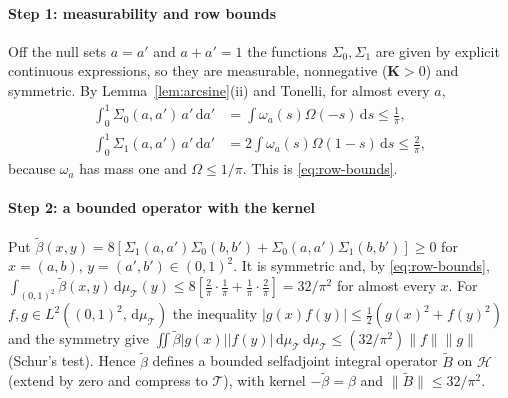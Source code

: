 \documentclass[preprint,12pt,a4paper]{elsarticle}
\theoremstyle{remark}
\newcommand{\dd}{\,\mathrm d}
\begin{document}
\paragraph{Step 1: measurability and row bounds}
Off the null sets $a=a'$ and $a+a'=1$ the functions $\Sigma_0,\Sigma_1$ are given by
explicit continuous expressions, so they are measurable, nonnegative ($\mathbf K>0$) and
symmetric. By Lemma~\ref{lem:arcsine}(ii) and Tonelli, for almost every $a$,
\begin{align*}
 \int_0^1\Sigma_0(a,a')\,a'\dd a'&=\int\omega_a(s)\Omega(-s)\dd s\le\frac1\pi,\\
 \int_0^1\Sigma_1(a,a')\,a'\dd a'&=2\int\omega_a(s)\Omega(1-s)\dd s\le\frac2\pi,
\end{align*}
because $\omega_a$ has mass one and $\Omega\le1/\pi$. This is \eqref{eq:row-bounds}.

\paragraph{Step 2: a bounded operator with the kernel}
Put $\tilde\beta(x,y)=8[\Sigma_1(a,a')\Sigma_0(b,b')+\Sigma_0(a,a')\Sigma_1(b,b')]\ge0$ for
$x=(a,b)$, $y=(a',b')\in(0,1)^2$. It is symmetric and, by \eqref{eq:row-bounds},
$\int_{(0,1)^2}\tilde\beta(x,y)\dd\mu_{\mathcal T}(y)\le8[\frac2\pi\cdot\frac1\pi+\frac1\pi\cdot\frac2\pi]=32/\pi^2$
for almost every $x$. For $f,g\in L^2((0,1)^2,\dd\mu_{\mathcal T})$ the inequality
$|g(x)f(y)|\le\frac12(g(x)^2+f(y)^2)$ and the symmetry give
$\iint\tilde\beta|g(x)||f(y)|\dd\mu_{\mathcal T}\dd\mu_{\mathcal T}\le(32/\pi^2)\|f\|\|g\|$ (Schur's test). Hence $\tilde\beta$
defines a bounded selfadjoint integral operator $\tilde B$ on $\mathcal H$ (extend by zero and
compress to $\mathcal T$), with kernel $-\tilde\beta=\beta$ and $\|\tilde B\|\le32/\pi^2$.
\end{document}
